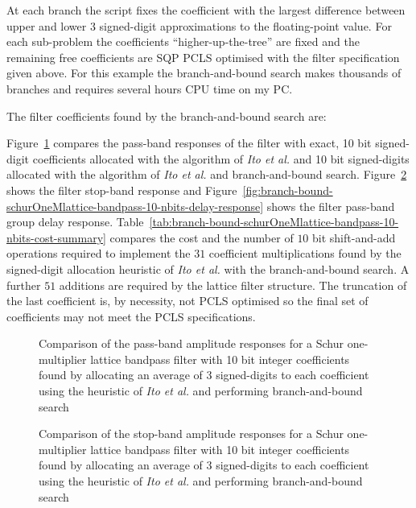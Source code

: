 \documentclass[a4paper,twoside,10pt,english]{report}
\begin{document}
At each branch the script fixes the coefficient with the largest difference
between upper and lower $3$ signed-digit approximations to the floating-point
value. For each sub-problem the coefficients ``higher-up-the-tree'' are fixed
and the remaining free coefficients are SQP PCLS optimised with the filter 
specification given above. For this example the branch-and-bound search
makes thousands of branches and requires several hours CPU time on my PC.

The filter coefficients found by the branch-and-bound search are:
\begin{small}


\end{small}
Figure~\ref{fig:branch-bound-schurOneMlattice-bandpass-10-nbits-pass-response}
compares the pass-band responses of the filter with exact, 10 bit signed-digit
coefficients allocated with the algorithm of \emph{Ito et al.} and 10 bit
signed-digits allocated with the algorithm of \emph{Ito et al.} and
branch-and-bound search.
Figure~\ref{fig:branch-bound-schurOneMlattice-bandpass-10-nbits-stop-response}
shows the filter stop-band response and
Figure~\ref{fig:branch-bound-schurOneMlattice-bandpass-10-nbits-delay-response}
shows the filter pass-band group delay response.
Table~\ref{tab:branch-bound-schurOneMlattice-bandpass-10-nbits-cost-summary} 
compares the cost and the number of $10$ bit shift-and-add operations required to
implement the $31$ coefficient multiplications found by the signed-digit 
allocation heuristic of \emph{Ito et al.} with the branch-and-bound search. A 
further $51$ additions are required by the lattice filter structure. The
truncation of the last coefficient is, by necessity, not PCLS optimised so the
final set of coefficients may not meet the PCLS specifications.
\begin{figure}[!htbp]
\begin{center}
\scalebox{0.7}{}
\caption{Comparison of the pass-band amplitude responses for a Schur
  one-multiplier lattice bandpass filter with 10 bit integer coefficients found
  by allocating an average of 3 signed-digits to each coefficient using the
  heuristic of \emph{Ito et al.} and performing branch-and-bound search}
\label{fig:branch-bound-schurOneMlattice-bandpass-10-nbits-pass-response}
\end{center}
\end{figure}
\begin{figure}[!htbp]
\begin{center}
\scalebox{0.7}{}
\caption{Comparison of the stop-band amplitude responses for a Schur
  one-multiplier lattice bandpass filter with 10 bit integer coefficients found
  by allocating an average of 3 signed-digits to each coefficient using the
  heuristic of \emph{Ito et al.} and performing branch-and-bound search}
\label{fig:branch-bound-schurOneMlattice-bandpass-10-nbits-stop-response}
\end{center}
\end{figure}
\end{document}
